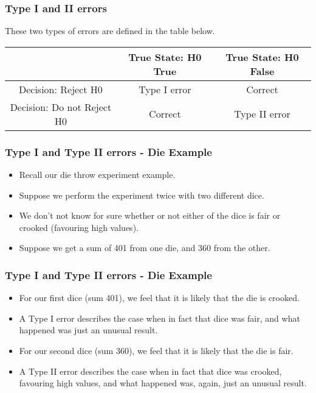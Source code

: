 \documentclass[a4]{beamer}
\begin{document}
\begin{frame}
\frametitle{Type I and II errors}
\large
These two types of errors are defined in the table below.
\small
\begin{center}
\begin{tabular}{|c|c|c|}
\hline
&True State: H0 True & True State: H0 False\\\hline
Decision: Reject H0 & Type I error& Correct\\\hline
Decision: Do not Reject H0 & Correct &Type II error\\ \hline
\end{tabular}
\end{center}
\end{frame}



\begin{frame}
\frametitle{Type I and Type II errors - Die Example}
\begin{itemize}
\item Recall our die throw experiment example.
\item Suppose we perform the experiment twice with two different dice.
\item We don't not know for sure whether or not either of the dice is fair or crooked (favouring high values).
\item Suppose we get a sum of 401 from one die, and 360 from the other.
\end{itemize}
\end{frame}

\begin{frame}
\frametitle{Type I and Type II errors - Die Example}
\begin{itemize}
\item For our first dice (sum 401), we feel that it is likely that the die is crooked.
\item A Type I error describes the case when in fact that dice was fair, and what happened was just an unusual result.
\item For our second dice (sum 360), we feel that it is likely that the die is fair.
\item A Type II error describes the case when in fact that dice was crooked, favouring high values, and what happened was, again, just an unusual result.
\end{itemize}
\end{frame}
\end{document}
